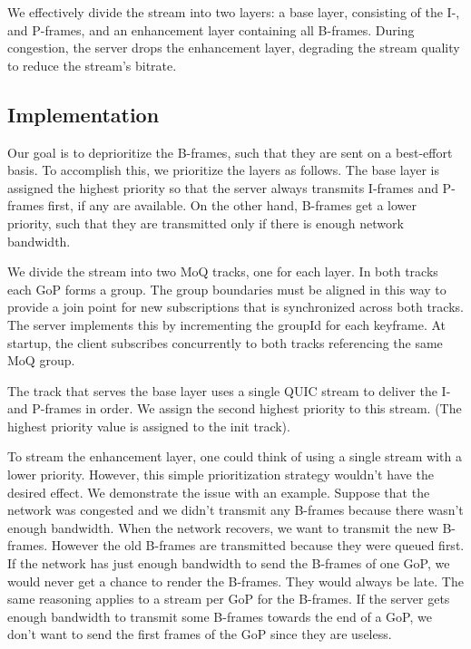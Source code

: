 We effectively divide the stream into two layers: a base layer, consisting of the I-, and P-frames, and an enhancement layer containing all B-frames. During congestion, the server drops the enhancement layer, degrading the stream quality to reduce the stream's bitrate.


\subsection{Implementation}
Our goal is to deprioritize the B-frames, such that they are sent on a best-effort basis. To accomplish this, we prioritize the layers as follows. The base layer is assigned the highest priority so that the server always transmits I-frames and P-frames first, if any are available. On the other hand, B-frames get a lower priority, such that they are transmitted only if there is enough network bandwidth.

We divide the stream into two MoQ tracks, one for each layer. In both tracks each GoP forms a group. The group boundaries must be aligned in this way to provide a join point for new subscriptions that is synchronized across both tracks. The server implements this by incrementing the groupId for each keyframe. At startup, the client subscribes concurrently to both tracks referencing the same MoQ group.

The track that serves the base layer uses a single QUIC stream to deliver the I- and P-frames in order. 
We assign the second highest priority to this stream. (The highest priority value is assigned to the
init track).

To stream the enhancement layer, one could think of using a single stream with a lower priority. However, this simple prioritization strategy wouldn't have the desired effect. We demonstrate the issue with an example. Suppose that the network was congested and we didn't transmit any B-frames because there wasn't enough bandwidth. When the network recovers, we want to transmit the new B-frames. However the old B-frames are transmitted because they were queued first. If the network has just enough bandwidth to send the B-frames of one GoP, we would never get a chance to render the B-frames. They would always be late. The same reasoning applies to a stream per GoP for the B-frames. If the server gets enough bandwidth to transmit some B-frames towards the end of a GoP, we don't want to send the first frames of the GoP since they are useless. 

